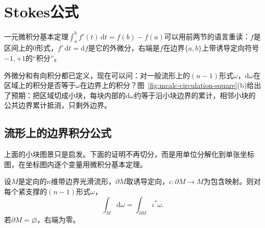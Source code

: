 \section{Stokes公式}
\label{sec:mcalc-stokes}

一元微积分基本定理$\int_a^bf'(t)\,\mathrm dt=f(b)-f(a)$可以用前两节的语言重读：$f$是区间上的$0$形式，$f'\,\mathrm dt=\mathrm df$是它的外微分，右端是$f$在边界$\{a,b\}$上带诱导定向符号$-1,+1$的“积分”。

外微分和有向积分都已定义，现在可以问：对一般流形上的$(n-1)$形式$\omega$，$\mathrm d\omega$在区域上的积分是否等于$\omega$在边界上的积分？图~\ref{fig:mcalc-circulation-square}(b)给出了预期：把区域切成小块，每块内部的$\mathrm d\omega$约等于沿小块边界的累计，相邻小块的公共边界累计抵消，只剩外边界。

\subsection{流形上的边界积分公式}
\label{sec:mcalc-stokes-general}

上面的小块图景只是启发。下面的证明不再切分，而是用单位分解化到单张坐标图，在坐标图内逐个变量用微积分基本定理。

\begin{theorem}[Stokes公式]
\label{thm:mcalc-stokes}
设$M$是定向的$n$维带边界光滑流形，$\partial M$取诱导定向，$\iota:\partial M\to M$为包含映射。则对每个紧支撑的$(n-1)$形式$\omega$，
\begin{equation}
\int_M\mathrm d\omega=\int_{\partial M}\iota^*\omega .
\label{eq:mcalc-stokes}
\end{equation}
若$\partial M=\varnothing$，右端为零。
\end{theorem}

